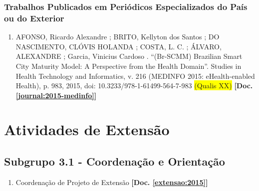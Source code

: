 \documentclass[a4paper,oneside,12pt]{article}
\begin{document}

\subsubsection{Trabalhos Publicados em Periódicos Especializados do País ou do Exterior}
\vspace{0.3cm}

\begin{enumerate}
\renewcommand{\labelenumi}{{\large\bfseries\arabic{enumi}.}}

\item AFONSO, Ricardo Alexandre ; BRITO, Kellyton dos Santos ; DO NASCIMENTO, CLÓVIS HOLANDA ; COSTA, L.  C. ; ÁLVARO, ALEXANDRE ; Garcia, Vinicius Cardoso . ``(Br-SCMM) Brazilian Smart City Maturity Model: A Perspective from the Health Domain''. Studies in Health Technology and Informatics, v. 216 (MEDINFO 2015: eHealth-enabled Health), p. 983, 2015, doi: 10.3233/978-1-61499-564-7-983 \colorbox{yellow}{(Qualis XX)} \textbf{[Doc. \ref{journal:2015-medinfo}]}

\end{enumerate}

\newpage
\section{Atividades de Extensão}

\subsection{Subgrupo 3.1 - Coordenação e Orientação}
\vspace{0.3cm}

\begin{enumerate}
\renewcommand{\labelenumi}{{\large\bfseries\arabic{enumi}.}}

    \item Coordenação de Projeto de Extensão \textbf{[Doc. \ref{extensao:2015}]}

\end{enumerate}
\end{document}
